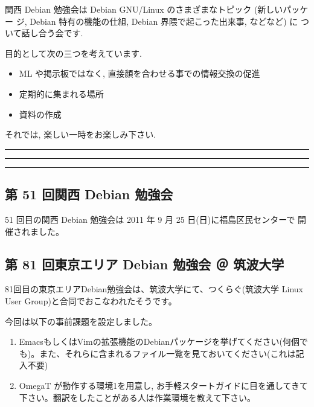 \documentclass[mingoth,a4paper]{jsarticle}
\begin{document}
関西 Debian 勉強会は Debian GNU/Linux のさまざまなトピック (新しいパッケー
ジ, Debian 特有の機能の仕組, Debian 界隈で起こった出来事, などなど) に
ついて話し合う会です.

目的として次の三つを考えています.
\begin{itemize}
      \item ML や掲示板ではなく, 直接顔を合わせる事での情報交換の促進
      \item 定期的に集まれる場所
      \item 資料の作成
\end{itemize}

それでは, 楽しい一時をお楽しみ下さい.

\clearpage

\begin{minipage}[b]{0.2\hsize}
 {}
\end{minipage}
\begin{minipage}[b]{0.8\hsize}
\hrule
\vspace{2mm}
\hrule
\setcounter{tocdepth}{1}
\tableofcontents
\vspace{2mm}
\hrule
\end{minipage}



\subsection{第 51 回関西 Debian 勉強会}
51 回目の関西 Debian 勉強会は 2011 年 9 月 25 日(日)に福島区民センターで
開催されました。

\subsection{第 81 回東京エリア Debian 勉強会 ＠ 筑波大学}
81回目の東京エリアDebian勉強会は、筑波大学にて、つくらぐ(筑波大学 Linux
User Group)と合同でおこなわれたそうです。


\clearpage

今回は以下の事前課題を設定しました。


\begin{enumerate}
 \item EmacsもしくはVimの拡張機能のDebianパッケージを挙げてください(何個でも)。また、それらに含まれるファイル一覧を見ておいてください(これは記入不要)
 \item OmegaT が動作する環境1を用意し, お手軽スタートガイドに目を通してきて下さい。翻訳をしたことがある人は作業環境を教えて下さい。
\end{enumerate}
\end{document}
